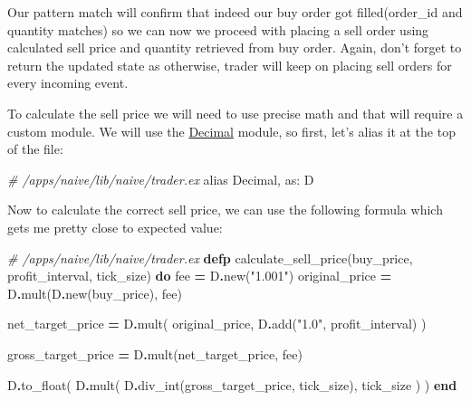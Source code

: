 \documentclass[
  oneside]{book}
\newenvironment{Shaded}{\begin{snugshade}}{\end{snugshade}}
\newcommand{\CommentTok}[1]{\textcolor[rgb]{0.56,0.35,0.01}{\textit{#1}}}
\newcommand{\ConstantTok}[1]{\textcolor[rgb]{0.00,0.00,0.00}{#1}}
\newcommand{\ImportTok}[1]{#1}
\newcommand{\KeywordTok}[1]{\textcolor[rgb]{0.13,0.29,0.53}{\textbf{#1}}}
\newcommand{\NormalTok}[1]{#1}
\newcommand{\OperatorTok}[1]{\textcolor[rgb]{0.81,0.36,0.00}{\textbf{#1}}}
\newcommand{\StringTok}[1]{\textcolor[rgb]{0.31,0.60,0.02}{#1}}
\newcommand{\VariableTok}[1]{\textcolor[rgb]{0.00,0.00,0.00}{#1}}
\begin{document}
Our pattern match will confirm that indeed our buy order got filled(order\_id and quantity matches) so we can now we proceed with placing a sell order using calculated sell price and quantity retrieved from buy order.
Again, don't forget to return the updated state as otherwise, trader will keep on placing sell orders for every incoming event.

To calculate the sell price we will need to use precise math and that will require a custom module. We will use the \href{https://github.com/ericmj/decimal}{Decimal} module, so first, let's alias it at the top of the file:

\begin{Shaded}
\begin{Highlighting}[]
\CommentTok{\# /apps/naive/lib/naive/trader.ex}
\ImportTok{alias} \ConstantTok{Decimal}\NormalTok{, }\VariableTok{as:}\NormalTok{ D}
\end{Highlighting}
\end{Shaded}

Now to calculate the correct sell price, we can use the following formula which gets me pretty close to expected value:

\begin{Shaded}
\begin{Highlighting}[]
  \CommentTok{\# /apps/naive/lib/naive/trader.ex}
  \KeywordTok{defp}\NormalTok{ calculate\_sell\_price(buy\_price, profit\_interval, tick\_size) }\KeywordTok{do}
\NormalTok{    fee }\OperatorTok{=}\NormalTok{ D}\OperatorTok{.}\NormalTok{new(}\StringTok{"1.001"}\NormalTok{)}
\NormalTok{    original\_price }\OperatorTok{=}\NormalTok{ D}\OperatorTok{.}\NormalTok{mult(D}\OperatorTok{.}\NormalTok{new(buy\_price), fee)}

\NormalTok{    net\_target\_price }\OperatorTok{=}
\NormalTok{      D}\OperatorTok{.}\NormalTok{mult(}
\NormalTok{        original\_price,}
\NormalTok{        D}\OperatorTok{.}\NormalTok{add(}\StringTok{"1.0"}\NormalTok{, profit\_interval)}
\NormalTok{      )}

\NormalTok{    gross\_target\_price }\OperatorTok{=}\NormalTok{ D}\OperatorTok{.}\NormalTok{mult(net\_target\_price, fee)}

\NormalTok{    D}\OperatorTok{.}\NormalTok{to\_float(}
\NormalTok{      D}\OperatorTok{.}\NormalTok{mult(}
\NormalTok{        D}\OperatorTok{.}\NormalTok{div\_int(gross\_target\_price, tick\_size),}
\NormalTok{        tick\_size}
\NormalTok{      )}
\NormalTok{    )}
  \KeywordTok{end}
\end{Highlighting}
\end{Shaded}
\end{document}
